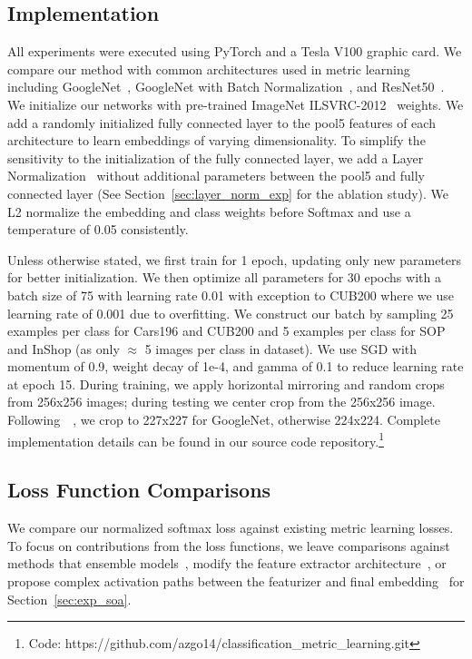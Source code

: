 \documentclass{bmvc2k}
\begin{document}
\subsection{Implementation}

All experiments were executed using PyTorch and a Tesla V100 graphic card. We compare our method with common architectures used in metric learning including GoogleNet~\cite{googlenet2014}, GoogleNet with Batch Normalization~\cite{batchnorm}, and ResNet50~\cite{kaiming16}. We initialize our networks with pre-trained ImageNet ILSVRC-2012~\cite{imagenet_cvpr09} weights. We add a randomly initialized fully connected layer to the pool5 features of each architecture to learn embeddings of varying dimensionality. To simplify the sensitivity to the initialization of the fully connected layer, we add a Layer Normalization~\cite{layernorm} without additional parameters between the pool5 and fully connected layer (See Section~\ref{sec:layer_norm_exp} for the ablation study). We L2 normalize the embedding and class weights before Softmax and use a temperature of 0.05 consistently.

Unless otherwise stated, we first train for 1 epoch, updating only new parameters for better initialization. We then optimize all parameters for 30 epochs with a batch size of 75 with learning rate 0.01 with exception to CUB200 where we use learning rate of 0.001 due to overfitting. We construct our batch by sampling 25 examples per class for Cars196 and CUB200 and 5 examples per class for SOP and InShop (as only $\approx$ 5 images per class in dataset). We use SGD with momentum of 0.9, weight decay of 1e-4, and gamma of 0.1 to reduce learning rate at epoch 15. During training, we apply horizontal mirroring and random crops from 256x256 images; during testing we center crop from the 256x256 image. Following~\cite{angular}~\cite{nofusslearning}, we crop to 227x227 for GoogleNet, otherwise 224x224. Complete implementation details can be found in our source code repository.\footnote{Code: https://github.com/azgo14/classification\_metric\_learning.git}


\subsection{Loss Function Comparisons}

We compare our normalized softmax loss against existing metric learning losses. To focus on contributions from the loss functions, we leave comparisons against methods that ensemble models~\cite{yuan2016HDC, Xuan2018DeepRE}, modify the feature extractor architecture~\cite{attention_metric}, or propose complex activation paths between the featurizer and final embedding~\cite{abier} for Section~\ref{sec:exp_soa}.
\end{document}
